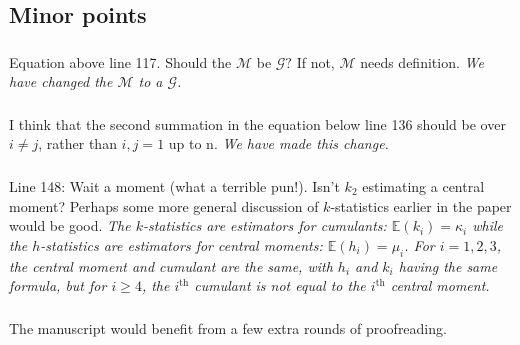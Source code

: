 \documentclass[11pt]{amsart}
\begin{document}
\subsection*{Minor points}
\subsubsection{} Equation above line 117. Should the $\mathcal{M}$ be $\mathcal{G}?$ If not, $\mathcal{M}$ needs definition. \textit{We have changed the $\mathcal{M}$ to a $\mathcal{G}$.}
\subsubsection{} I think that the second summation in the equation below line 136 should be over $i\neq j$, rather than
$i,j = 1$ up to n.
\textit{We have made this change.}
\subsubsection{} Line 148: Wait a moment (what a terrible pun!). Isn't $k_2$ estimating a central moment? Perhaps some more general discussion of $k$-statistics earlier in the paper would be good.
\textit{The $k$-statistics are estimators for cumulants: $\mathbb{E}(k_i) = \kappa_i$ while the $h$-statistics are estimators for central moments: $\mathbb{E}(h_i) = \mu_i$. For $i=1,2,3$, the central moment and cumulant are the same, with $h_i$ and $k_i$ having the same formula, but for $i\geq 4$, the $i^\text{th}$ cumulant is not equal to the $i^\text{th}$ central moment.}
\subsubsection{} The manuscript would benefit from a few extra rounds of proofreading.
\end{document}
